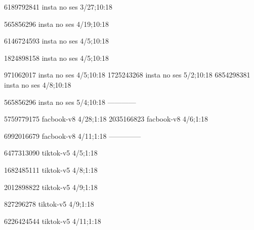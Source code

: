 6189792841 insta no ses
3/27;10:18

565856296 insta no ses
4/19;10:18

6146724593 insta no ses
4/5;10:18

1824898158 insta no ses
4/5;10:18

971062017 insta no ses
4/5;10:18
1725243268 insta no ses
5/2;10:18
6854298381 insta no ses
4/8;10:18

565856296 insta no ses
5/4;10:18
------------


5759779175 facbook-v8
4/28;1:18
2035166823 facbook-v8
4/6;1:18

6992016679 facbook-v8
4/11;1:18
--------------



6477313090 tiktok-v5
4/5;1:18

1682485111 tiktok-v5
4/8;1:18

2012898822 tiktok-v5
4/9;1:18

827296278 tiktok-v5
4/9;1:18

6226424544 tiktok-v5
4/11;1:18


